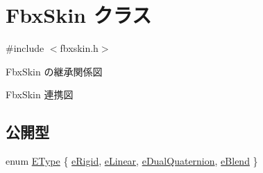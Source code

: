 \hypertarget{class_fbx_skin}{}\section{Fbx\+Skin クラス}
\label{class_fbx_skin}


{\ttfamily \#include $<$fbxskin.\+h$>$}



Fbx\+Skin の継承関係図


Fbx\+Skin 連携図
\subsection*{公開型}
\begin{DoxyCompactItemize}
\item 
enum \hyperlink{class_fbx_skin_aee398789ebed22fa97269a26c6049a16}{E\+Type} \{ \hyperlink{class_fbx_skin_aee398789ebed22fa97269a26c6049a16a3113dda18b8784e09d60e0af60ac8f75}{e\+Rigid}, 
\hyperlink{class_fbx_skin_aee398789ebed22fa97269a26c6049a16add6c7b8a46adf0432f3c0e21986d5be8}{e\+Linear}, 
\hyperlink{class_fbx_skin_aee398789ebed22fa97269a26c6049a16a992d04fe41c48910271abdf4cde8c7d8}{e\+Dual\+Quaternion}, 
\hyperlink{class_fbx_skin_aee398789ebed22fa97269a26c6049a16af0f4a498471de5701994ed898252b864}{e\+Blend}
 \}
\end{DoxyCompactItemize}
